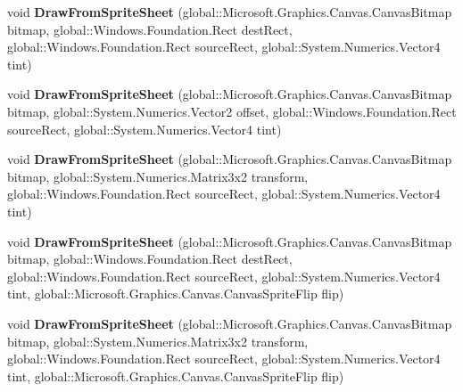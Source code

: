 \begin{DoxyCompactItemize}
void {\bfseries Draw\+From\+Sprite\+Sheet} (global\+::\+Microsoft.\+Graphics.\+Canvas.\+Canvas\+Bitmap bitmap, global\+::\+Windows.\+Foundation.\+Rect dest\+Rect, global\+::\+Windows.\+Foundation.\+Rect source\+Rect, global\+::\+System.\+Numerics.\+Vector4 tint)
\item 
\mbox{\label{class_microsoft_1_1_graphics_1_1_canvas_1_1_canvas_sprite_batch_af857e8b6752567fefd4c6a81a75b2e21}} 
void {\bfseries Draw\+From\+Sprite\+Sheet} (global\+::\+Microsoft.\+Graphics.\+Canvas.\+Canvas\+Bitmap bitmap, global\+::\+System.\+Numerics.\+Vector2 offset, global\+::\+Windows.\+Foundation.\+Rect source\+Rect, global\+::\+System.\+Numerics.\+Vector4 tint)
\item 
\mbox{\label{class_microsoft_1_1_graphics_1_1_canvas_1_1_canvas_sprite_batch_a757d700dcc20d105cec1a69997f48951}} 
void {\bfseries Draw\+From\+Sprite\+Sheet} (global\+::\+Microsoft.\+Graphics.\+Canvas.\+Canvas\+Bitmap bitmap, global\+::\+System.\+Numerics.\+Matrix3x2 transform, global\+::\+Windows.\+Foundation.\+Rect source\+Rect, global\+::\+System.\+Numerics.\+Vector4 tint)
\item 
\mbox{\label{class_microsoft_1_1_graphics_1_1_canvas_1_1_canvas_sprite_batch_a1a86d8b0f90e3534b1f78de4ab54d5b6}} 
void {\bfseries Draw\+From\+Sprite\+Sheet} (global\+::\+Microsoft.\+Graphics.\+Canvas.\+Canvas\+Bitmap bitmap, global\+::\+Windows.\+Foundation.\+Rect dest\+Rect, global\+::\+Windows.\+Foundation.\+Rect source\+Rect, global\+::\+System.\+Numerics.\+Vector4 tint, global\+::\+Microsoft.\+Graphics.\+Canvas.\+Canvas\+Sprite\+Flip flip)
\item 
\mbox{\label{class_microsoft_1_1_graphics_1_1_canvas_1_1_canvas_sprite_batch_afb583c7529206d1438558f6816c5e862}} 
void {\bfseries Draw\+From\+Sprite\+Sheet} (global\+::\+Microsoft.\+Graphics.\+Canvas.\+Canvas\+Bitmap bitmap, global\+::\+System.\+Numerics.\+Matrix3x2 transform, global\+::\+Windows.\+Foundation.\+Rect source\+Rect, global\+::\+System.\+Numerics.\+Vector4 tint, global\+::\+Microsoft.\+Graphics.\+Canvas.\+Canvas\+Sprite\+Flip flip)
\item 
\mbox{\label{class_microsoft_1_1_graphics_1_1_canvas_1_1_canvas_sprite_batch_adf9c3f59de40a640884b277dc8f5f51e}} 

\end{DoxyCompactItemize}
